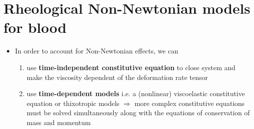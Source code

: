 \documentclass{beamer}
\newtheorem{thm}{Theorem}[theorem]
\begin{document}
	\section[Non-Newtonian Models]{Rheological Non-Newtonian models for blood}	
	
%    	
		            
	
	\begin{frame}%
		\begin{itemize}
			\item In order to account for Non-Newtonian effects, we can
			\begin{enumerate}
				\item use \textbf{time-independent constitutive equation} to close system and make the viscosity dependent of the
deformation rate tensor 
				\item use \textbf{time-dependent models} i.e. a (nonlinear) viscoelastic constitutive equation or thixotropic models $\Rightarrow$ more complex constitutive equations
must be solved simultaneously along with the equations of conservation of mass and momentum 
\end{enumerate}
		\end{itemize}
		
		
		
	\end{frame}
	
\end{document}
